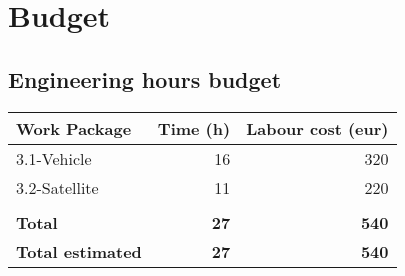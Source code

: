 \documentclass[12pt, titlepage]{article}
\begin{document}
\section{Budget}


\subsection{Engineering hours budget}
\begin{tabular}{ | l | r | r | }
\hline
Work Package & Time (h) & Labour cost (eur) \\ \hline
3.1-Vehicle & 16 & 320 \\ \hline
3.2-Satellite & 11 & 220 \\ \hline
 &  &  \\ \hline
\textbf{Total} & \textbf{27} & \textbf{540} \\ \hline
\textbf{Total estimated} & \textbf{27} & \textbf{540} \\
\hline
\end{tabular}




\pagebreak


\end{document}
